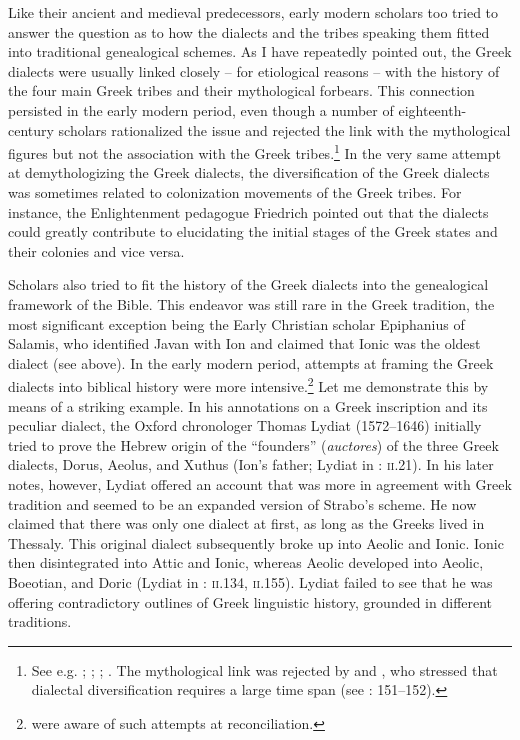 Like their ancient and medieval predecessors, early modern scholars too tried to answer the question as to how the dialects and the tribes speaking them fitted into traditional genealogical schemes. As I have repeatedly pointed out, the Greek dialects were usually linked closely – for etiological reasons – with the history of the four main Greek tribes and their mythological forbears. This connection persisted in the early modern period, even though a number of eighteenth-century scholars rationalized the issue and rejected the link with the mythological figures but not the association with the Greek tribes.\footnote{See e.g. \citet[3--4]{Walper1589}; \citet[166--167]{Labbe1639}; \citet[73]{Vitringa1689}; \citet[\textsc{xxiiii–xxvi}]{Harles1778}. The mythological link was rejected by \citet[\textsc{c.4}\textsc{\textsuperscript{v}}\textsc{–d.1}\textsc{\textsuperscript{r}}]{Thryllitsch1709} and \citet[108--110]{Hemsterhuis2015}, who stressed that dialectal diversification requires a large time span (see \citealt{Gerretzen1940}: 151–152).} In the very same attempt at demythologizing the Greek dialects, the diversification of the Greek dialects was sometimes related to colonization movements of the Greek tribes. For instance, the Enlightenment pedagogue Friedrich \citet[12]{Gedike1782} pointed out that the dialects could greatly contribute to elucidating the initial stages of the Greek states and their colonies and vice versa.

Scholars also tried to fit the history of the Greek dialects into the genealogical framework of the Bible. This endeavor was still rare in the Greek tradition, the most significant exception being the Early Christian scholar Epiphanius of Salamis, who identified Javan with Ion and claimed that Ionic was the oldest dialect (see  above). In the early modern period, attempts at framing the Greek dialects into biblical history were more intensive.\footnote{\citet[\textsc{c.1}\textsc{\textsuperscript{v}}]{Schwartz1702} were aware of such attempts at reconciliation.} Let me demonstrate this by means of a striking example. In his annotations on a Greek inscription and its peculiar dialect, the Oxford chronologer Thomas Lydiat (1572–1646) initially tried to prove the Hebrew origin of the “founders” (\textit{auctores}) of the three Greek dialects, Dorus, Aeolus, and Xuthus (Ion’s father; Lydiat in \citealt{Prideaux1676}: \textsc{ii}.21). In his later notes, however, Lydiat offered an account that was more in agreement with Greek tradition and seemed to be an expanded version of Strabo’s scheme. He now claimed that there was only one dialect at first, as long as the Greeks lived in Thessaly. This original dialect subsequently broke up into Aeolic and Ionic. Ionic then disintegrated into Attic and Ionic, whereas Aeolic developed into Aeolic, Boeotian, and Doric (Lydiat in \citealt{Prideaux1676}: \textsc{ii.134}, \textsc{ii.}155). Lydiat failed to see that he was offering contradictory outlines of Greek linguistic history, grounded in different traditions.

